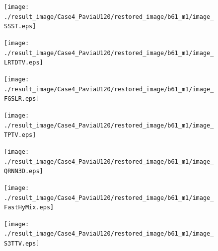 \begin{figure}[t]
\begin{center}
		\begin{minipage}{0.125\hsize}
			\centerline{\texttt{[image: ./result\_image/Case4\_PaviaU120/restored\_image/b61\_m1/image\_SSST.eps]}} %
		\end{minipage}
		\begin{minipage}{0.125\hsize}
			\centerline{\texttt{[image: ./result\_image/Case4\_PaviaU120/restored\_image/b61\_m1/image\_LRTDTV.eps]}} %
		\end{minipage}
		\begin{minipage}{0.125\hsize}
			\centerline{\texttt{[image: ./result\_image/Case4\_PaviaU120/restored\_image/b61\_m1/image\_FGSLR.eps]}} %
		\end{minipage}
		\begin{minipage}{0.125\hsize}
			\centerline{\texttt{[image: ./result\_image/Case4\_PaviaU120/restored\_image/b61\_m1/image\_TPTV.eps]}} %
		\end{minipage}
		\begin{minipage}{0.125\hsize}
			\centerline{\texttt{[image: ./result\_image/Case4\_PaviaU120/restored\_image/b61\_m1/image\_QRNN3D.eps]}} %
		\end{minipage}
		\begin{minipage}{0.125\hsize}
			\centerline{\texttt{[image: ./result\_image/Case4\_PaviaU120/restored\_image/b61\_m1/image\_FastHyMix.eps]}} %
		\end{minipage}
		\begin{minipage}{0.125\hsize}
			\centerline{\texttt{[image: ./result\_image/Case4\_PaviaU120/restored\_image/b61\_m1/image\_S3TTV.eps]}} %
		\end{minipage}
		\begin{minipage}{0.050\hsize}
			\centerline{\hspace{\hsize}} %
		\end{minipage}
		
		\vspace{1mm}
		

\end{center}
\end{figure}
